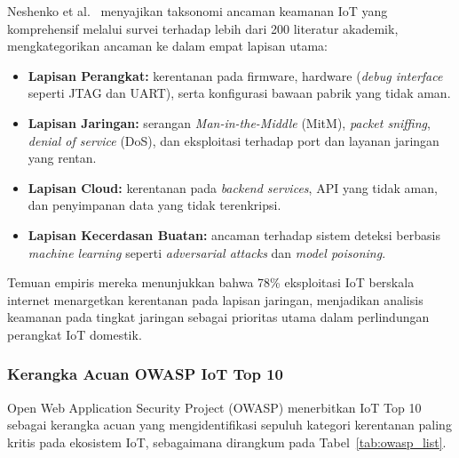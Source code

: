 \documentclass[conference]{IEEEtran}
\begin{document}
Neshenko et al.\ \cite{neshenko2019} menyajikan taksonomi ancaman keamanan IoT yang komprehensif melalui survei terhadap lebih dari 200 literatur akademik, mengkategorikan ancaman ke dalam empat lapisan utama:

\begin{itemize}
    \item \textbf{Lapisan Perangkat:} kerentanan pada firmware, hardware (\textit{debug interface} seperti JTAG dan UART), serta konfigurasi bawaan pabrik yang tidak aman.
    \item \textbf{Lapisan Jaringan:} serangan \textit{Man-in-the-Middle} (MitM), \textit{packet sniffing}, \textit{denial of service} (DoS), dan eksploitasi terhadap port dan layanan jaringan yang rentan.
    \item \textbf{Lapisan Cloud:} kerentanan pada \textit{backend services}, API yang tidak aman, dan penyimpanan data yang tidak terenkripsi.
    \item \textbf{Lapisan Kecerdasan Buatan:} ancaman terhadap sistem deteksi berbasis \textit{machine learning} seperti \textit{adversarial attacks} dan \textit{model poisoning}.
\end{itemize}

Temuan empiris mereka menunjukkan bahwa 78\% eksploitasi IoT berskala internet menargetkan kerentanan pada lapisan jaringan, menjadikan analisis keamanan pada tingkat jaringan sebagai prioritas utama dalam perlindungan perangkat IoT domestik.

\subsubsection{Kerangka Acuan OWASP IoT Top 10}

Open Web Application Security Project (OWASP) menerbitkan IoT Top 10\ \cite{owasp2018} sebagai kerangka acuan yang mengidentifikasi sepuluh kategori kerentanan paling kritis pada ekosistem IoT, sebagaimana dirangkum pada Tabel\ \ref{tab:owasp_list}.
\end{document}
